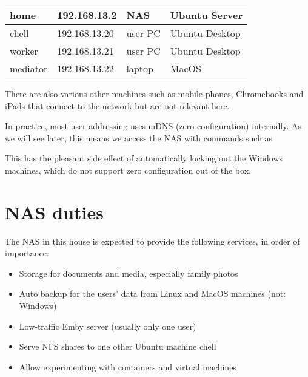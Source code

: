 \documentclass[a4paper,10pt,english]{sphinxmanual}
\begin{document}
\begin{savenotes}\sphinxattablestart
\centering
\begin{tabulary}{\linewidth}[t]{|T|T|T|T|}
\hline

home
&
192.168.13.2
&
NAS
&
Ubuntu Server
\\
\hline
chell
&
192.168.13.20
&
user PC
&
Ubuntu Desktop
\\
\hline
worker
&
192.168.13.21
&
user PC
&
Ubuntu Desktop
\\
\hline
mediator
&
192.168.13.22
&
laptop
&
MacOS
\\
\hline
\end{tabulary}
\par
\sphinxattableend\end{savenotes}

There are also various other machines such as mobile phones, Chromebooks and
iPads that connect to the network but are not relevant here.

In practice, most user addressing uses mDNS (zero configuration) internally. As
we will see later, this means we access the NAS with commands such as

\begin{sphinxVerbatim}[commandchars=\\\{\}]
 
\end{sphinxVerbatim}

This has the pleasant side effect of automatically locking out the Windows
machines, which do not support zero configuration out of the box.


\section{NAS duties}
\label{\detokenize{goals:nas-duties}}
The NAS in this house is expected to provide the following services, in order of
importance:
\begin{itemize}
\item {} 
Storage for documents and media, especially family photos

\item {} 
Auto backup for the users’ data from Linux and MacOS machines (not: Windows)

\item {} 
Low-traffic Emby server (usually only one user)

\item {} 
Serve NFS shares to one other Ubuntu machine chell

\item {} 
Allow experimenting with containers and virtual machines

\end{itemize}
\end{document}
